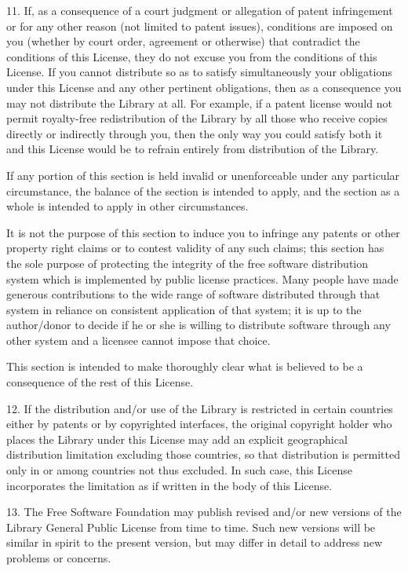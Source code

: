 \begin{DoxyVerb}
11. If, as a consequence of a court judgment or allegation of patent infringement or for any other
reason (not limited to patent issues), conditions are imposed on you (whether by court order,
agreement or otherwise) that contradict the conditions of this License, they do not excuse you from
the conditions of this License. If you cannot distribute so as to satisfy simultaneously your
obligations under this License and any other pertinent obligations, then as a consequence you may
not distribute the Library at all. For example, if a patent license would not permit royalty-free
redistribution of the Library by all those who receive copies directly or indirectly through you,
then the only way you could satisfy both it and this License would be to refrain entirely from
distribution of the Library.

If any portion of this section is held invalid or unenforceable under any particular circumstance,
the balance of the section is intended to apply, and the section as a whole is intended to apply in
other circumstances.

It is not the purpose of this section to induce you to infringe any patents or other property right
claims or to contest validity of any such claims; this section has the sole purpose of protecting
the integrity of the free software distribution system which is implemented by public license
practices. Many people have made generous contributions to the wide range of software distributed
through that system in reliance on consistent application of that system; it is up to the
author/donor to decide if he or she is willing to distribute software through any other system and a
licensee cannot impose that choice.

This section is intended to make thoroughly clear what is believed to be a consequence of the rest
of this License.

12. If the distribution and/or use of the Library is restricted in certain countries either by
patents or by copyrighted interfaces, the original copyright holder who places the Library under
this License may add an explicit geographical distribution limitation excluding those countries, so
that distribution is permitted only in or among countries not thus excluded. In such case, this
License incorporates the limitation as if written in the body of this License.

13. The Free Software Foundation may publish revised and/or new versions of the Library General
Public License from time to time. Such new versions will be similar in spirit to the present
version, but may differ in detail to address new problems or concerns.


\end{DoxyVerb}
